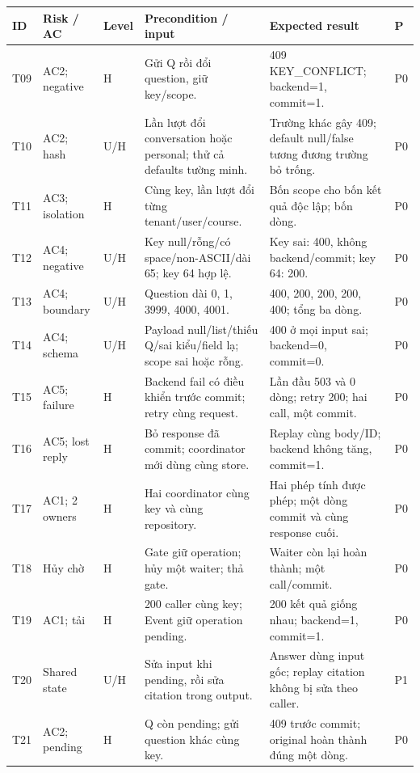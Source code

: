 \documentclass[11pt,a4paper]{article}
\begin{document}
\begin{tabular}{@{}L{9mm}L{16mm}L{14mm}L{47mm}L{59mm}L{10mm}@{}}
\toprule
\textbf{ID} & \textbf{Risk / AC} & \textbf{Level} & \textbf{Precondition / input} & \textbf{Expected result} & \textbf{P}\\\midrule
T09 & AC2; negative & H & Gửi Q rồi đổi question, giữ key/scope. & 409 KEY\_CONFLICT; backend=1, commit=1. & P0\\[4pt]
T10 & AC2; hash & U/H & Lần lượt đổi conversation hoặc personal; thử cả defaults tường minh. & Trường khác gây 409; default null/false tương đương trường bỏ trống. & P0\\[4pt]
T11 & AC3; isolation & H & Cùng key, lần lượt đổi từng tenant/user/course. & Bốn scope cho bốn kết quả độc lập; bốn dòng. & P0\\[4pt]
T12 & AC4; negative & U/H & Key null/rỗng/có space/non-ASCII/dài 65; key 64 hợp lệ. & Key sai: 400, không backend/commit; key 64: 200. & P0\\[4pt]
T13 & AC4; boundary & U/H & Question dài 0, 1, 3999, 4000, 4001. & 400, 200, 200, 200, 400; tổng ba dòng. & P0\\[4pt]
T14 & AC4; schema & U/H & Payload null/list/thiếu Q/sai kiểu/field lạ; scope sai hoặc rỗng. & 400 ở mọi input sai; backend=0, commit=0. & P0\\[4pt]
T15 & AC5; failure & H & Backend fail có điều khiển trước commit; retry cùng request. & Lần đầu 503 và 0 dòng; retry 200; hai call, một commit. & P0\\[4pt]
T16 & AC5; lost reply & H & Bỏ response đã commit; coordinator mới dùng cùng store. & Replay cùng body/ID; backend không tăng, commit=1. & P0\\[4pt]
T17 & AC1; 2 owners & H & Hai coordinator cùng key và cùng repository. & Hai phép tính được phép; một dòng commit và cùng response cuối. & P0\\[4pt]
T18 & Hủy chờ & H & Gate giữ operation; hủy một waiter; thả gate. & Waiter còn lại hoàn thành; một call/commit. & P0\\[4pt]
T19 & AC1; tải & H & 200 caller cùng key; Event giữ operation pending. & 200 kết quả giống nhau; backend=1, commit=1. & P0\\[4pt]
T20 & Shared state & U/H & Sửa input khi pending, rồi sửa citation trong output. & Answer dùng input gốc; replay citation không bị sửa theo caller. & P1\\[4pt]
T21 & AC2; pending & H & Q còn pending; gửi question khác cùng key. & 409 trước commit; original hoàn thành đúng một dòng. & P0\\
\bottomrule
\end{tabular}
\end{document}
